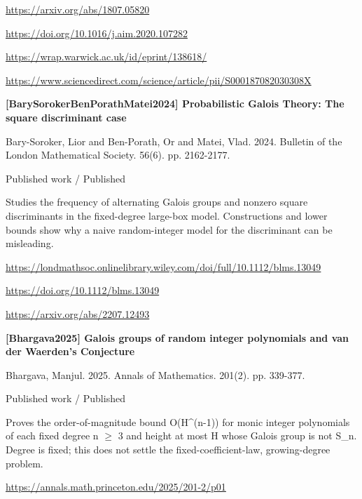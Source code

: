 \documentclass[11pt,a4paper,oneside,openany]{book}
\begin{document}
{\footnotesize\url{https://arxiv.org/abs/1807.05820}}\par
{\footnotesize\url{https://doi.org/10.1016/j.aim.2020.107282}}\par
{\footnotesize\url{https://wrap.warwick.ac.uk/id/eprint/138618/}}\par
{\footnotesize\url{https://www.sciencedirect.com/science/article/pii/S000187082030308X}}\par
\vspace{9pt}
\hypertarget{ref:BarySorokerBenPorathMatei2024}{}
{\sffamily\bfseries\color{atlasgreen}[BarySorokerBenPorathMatei2024] Probabilistic Galois Theory: The square discriminant case}\par
\color{black} Bary-Soroker, Lior and Ben-Porath, Or and Matei, Vlad. 2024. Bulletin of the London Mathematical Society. 56(6). pp. 2162-2177.\par
{\small\sffamily\color{atlasgold}Published work / Published}\par
\color{black} Studies the frequency of alternating Galois groups and nonzero square discriminants in the fixed-degree large-box model. Constructions and lower bounds show why a naive random-integer model for the discriminant can be misleading.\par
{\footnotesize\url{https://londmathsoc.onlinelibrary.wiley.com/doi/full/10.1112/blms.13049}}\par
{\footnotesize\url{https://doi.org/10.1112/blms.13049}}\par
{\footnotesize\url{https://arxiv.org/abs/2207.12493}}\par
\vspace{9pt}
\hypertarget{ref:Bhargava2025}{}
{\sffamily\bfseries\color{atlasgreen}[Bhargava2025] Galois groups of random integer polynomials and van der Waerden's Conjecture}\par
\color{black} Bhargava, Manjul. 2025. Annals of Mathematics. 201(2). pp. 339-377.\par
{\small\sffamily\color{atlasgold}Published work / Published}\par
\color{black} Proves the order-of-magnitude bound O(H\textasciicircum{}(n-1)) for monic integer polynomials of each fixed degree n \ensuremath{\ge} 3 and height at most H whose Galois group is not S\_\allowbreak{}n. Degree is fixed; this does not settle the fixed-coefficient-law, growing-degree problem.\par
{\footnotesize\url{https://annals.math.princeton.edu/2025/201-2/p01}}\par
\end{document}

